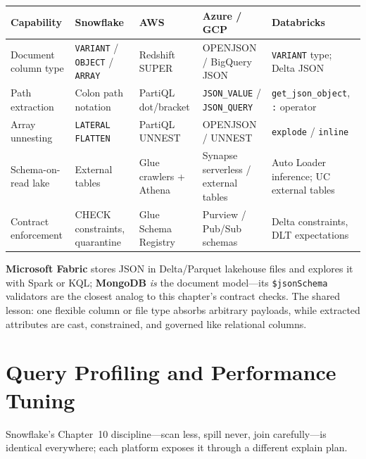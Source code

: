 \begin{center}
\footnotesize
\begin{tabular}{@{}p{2.5cm}p{2.9cm}p{2.7cm}p{2.9cm}p{2.9cm}@{}}
\toprule
\textbf{Capability} & \textbf{Snowflake} & \textbf{AWS} & \textbf{Azure / GCP} & \textbf{Databricks} \\
\midrule
Document column type & \texttt{VARIANT} / \texttt{OBJECT} / \texttt{ARRAY} & Redshift SUPER & OPENJSON / BigQuery JSON & \texttt{VARIANT} type; Delta JSON \\
Path extraction & Colon path notation & PartiQL dot/bracket & \texttt{JSON\_VALUE} / \texttt{JSON\_QUERY} & \texttt{get\_json\_object}, \texttt{:} operator \\
Array unnesting & \texttt{LATERAL FLATTEN} & PartiQL UNNEST & OPENJSON / UNNEST & \texttt{explode} / \texttt{inline} \\
Schema-on-read lake & External tables & Glue crawlers + Athena & Synapse serverless / external tables & Auto Loader inference; UC external tables \\
Contract enforcement & CHECK constraints, quarantine & Glue Schema Registry & Purview / Pub/Sub schemas & Delta constraints, DLT expectations \\
\bottomrule
\end{tabular}
\end{center}

\noindent \textbf{Microsoft Fabric} stores JSON in Delta/Parquet lakehouse files and explores it
with Spark or KQL; \textbf{MongoDB} \emph{is} the document model---its \texttt{\$jsonSchema}
validators are the closest analog to this chapter's contract checks. The shared lesson: one
flexible column or file type absorbs arbitrary payloads, while extracted attributes are cast,
constrained, and governed like relational columns.

\section{Query Profiling and Performance Tuning}
%
Snowflake's Chapter~10 discipline---scan less, spill never, join carefully---is identical
everywhere; each platform exposes it through a different explain plan.

